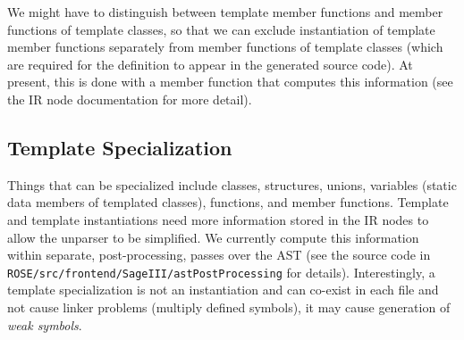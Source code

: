    We might have to distinguish between template member functions and member functions
   of template classes, so that we can exclude instantiation of template member functions
   separately from member functions of template classes (which are required for the
   definition to appear in the generated source code).  At present, this is done with a
   member function that computes this information (see the IR node documentation for more detail).


\subsection{Template Specialization}
   Things that can be specialized include classes, structures, unions,
variables (static data members of templated classes), functions, and member functions.
   Template and template instantiations need more information stored in the IR nodes to
allow the unparser to be simplified.  We currently compute this information within
separate, post-processing, passes over the AST (see the source code in
{\tt ROSE/src/frontend/SageIII/astPostProcessing} for details).
   Interestingly, a template specialization is not an instantiation and can co-exist in each
file and not cause linker problems (multiply defined symbols), it may cause generation of 
{\em weak symbols}.


